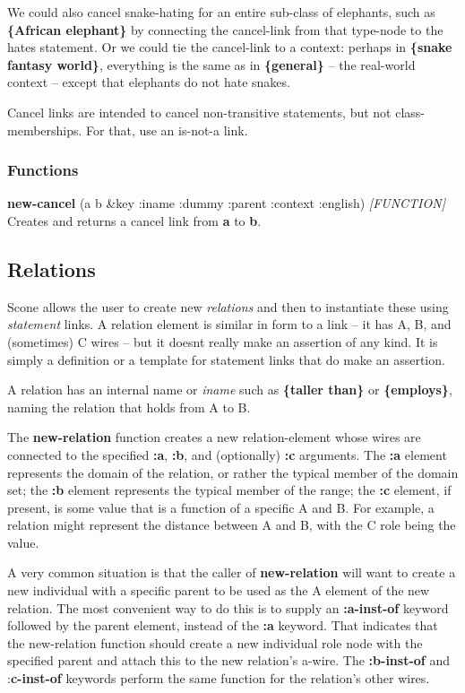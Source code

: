 \documentclass[titlepage,twoside,openright,11pt]{article}
\begin{document}
We could also cancel snake-hating for an entire sub-class of elephants,
such as \textbf{\{African elephant\}} by connecting the cancel-link from
that type-node to the hates statement. Or we could tie the cancel-link
to a context: perhaps in \textbf{\{snake fantasy world\}}, everything is
the same as in \textbf{\{general\}} -- the real-world context -- except
that elephants do not hate snakes.

Cancel links are intended to cancel non-transitive statements, but not
class-memberships. For that, use an is-not-a link.

\subsubsection{Functions}\label{functions-7}

\textbf{new-cancel} (a b \&key :iname :dummy :parent :context :english)
\emph{{[}FUNCTION{]}}\\
Creates and returns a cancel link from \textbf{a} to \textbf{b}.

\subsection{Relations}\label{relations}

Scone allows the user to create new \emph{relations} and then to
instantiate these using \emph{statement} links. A relation element is
similar in form to a link -- it has A, B, and (sometimes) C wires -- but
it doesn\textquotesingle t really make an assertion of any kind. It is
simply a definition or a template for statement links that do make an
assertion.

A relation has an internal name or \emph{iname} such as \textbf{\{taller
than\}} or \textbf{\{employs\}}, naming the relation that holds from A
to B.

The \textbf{new-relation} function creates a new relation-element whose
wires are connected to the specified \textbf{:a}, \textbf{:b}, and
(optionally) \textbf{:c} arguments. The \textbf{:a} element represents
the domain of the relation, or rather the typical member of the domain
set; the \textbf{:b} element represents the typical member of the range;
the \textbf{:c} element, if present, is some value that is a function of
a specific A and B. For example, a relation might represent the distance
between A and B, with the C role being the value.

A very common situation is that the caller of \textbf{new-relation} will
want to create a new individual with a specific parent to be used as the
A element of the new relation. The most convenient way to do this is to
supply an \textbf{:a-inst-of} keyword followed by the parent element,
instead of the \textbf{:a} keyword. That indicates that the new-relation
function should create a new individual role node with the specified
parent and attach this to the new relation's a-wire. The
\textbf{:b-inst-of} and :\textbf{c-inst-of} keywords perform the same
function for the relation's other wires.
\end{document}
